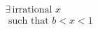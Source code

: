 \documentclass[preview]{standalone}
\begin{document}
\begin{align*}
\exists\, \text{irrational } x \\ \text{ such that } b < x < 1
\end{align*}
\end{document}
